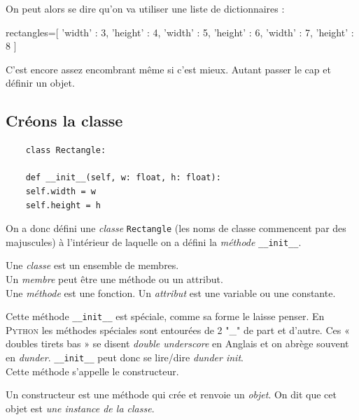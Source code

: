 \documentclass[a4paper,10pt,cours,firamath]{nsi}
\begin{document}
On peut alors se dire qu'on va utiliser une liste de dictionnaires :
\begin{pyc}
    rectangles=[
    {'width' : 3, 'height' : 4}, 
    {'width' : 5, 'height' : 6}, 
    {'width' : 7, 'height' : 8}
    ]
\end{pyc}

C'est encore assez encombrant même si c'est mieux. Autant passer le cap et définir un objet.
\subsection{Créons la classe}

\begin{pyc}
    \begin{verbatim}
    class Rectangle:
    
    def __init__(self, w: float, h: float):
    self.width = w
    self.height = h
    \end{verbatim}
\end{pyc}

On a donc défini une \textit{classe} \texttt{Rectangle} (les noms de classe commencent par des majuscules) à l'intérieur de laquelle on a défini la \textit{méthode} \texttt{__init__}.\\

\begin{definition}
    Une \textit{classe} est un ensemble de membres.\\
    Un \textit{membre} peut être une méthode ou un attribut.\\
    Une \textit{méthode} est une fonction.
    Un \textit{attribut} est une variable ou une constante.
\end{definition}

Cette méthode \texttt{__init__} est spéciale, comme sa forme le laisse penser. En \textsc{Python} les méthodes spéciales sont entourées de 2 "\_" de part et d'autre. Ces « doubles tirets bas » se disent \textit{double underscore} en Anglais et on abrège souvent en \textit{dunder}. \texttt{__init__} peut donc se lire/dire \textit{dunder init}.\\
Cette méthode s'appelle le constructeur.
\begin{definition}[ : constructeur]
    Un constructeur est une méthode qui crée et renvoie un \textit{objet}. On dit que cet objet est \textit{une instance de la classe}.
\end{definition}
\end{document}
